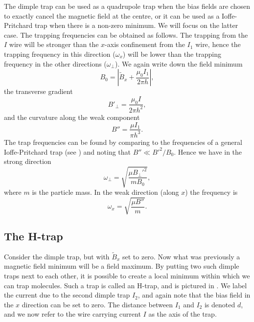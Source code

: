 The dimple trap can be used as a quadrupole trap when the bias fields are
chosen to exactly cancel the magnetic field at the centre, or it can be used as
a Ioffe-Pritchard trap when there is a non-zero minimum. We will focus on the
latter case.
%
The trapping frequencies can be obtained as follows. 
%
The trapping from the $I$ wire will be stronger than the $x$-axis
confinement from the $I_1$ wire, hence the trapping frequency in this
direction ($\omega_x$) will be lower than the trapping frequency in the other
directions ($\omega_\perp$). We again write down the field minimum
%
\begin{equation}
  B_0 = \left|\tilde{B}_x + \frac{\mu_0 I_1}{2\pi h}\right|,
\end{equation}
%
the transverse gradient
%
\begin{equation}
  B'_\perp = \frac{\mu_0 I}{2 \pi h^2},
  \label{theory:eqn:dimplegrad}
\end{equation}
%
and the curvature along the weak component
%
\begin{equation}
  B'' = \frac{\mu I_1}{\pi h^3}.
\end{equation}
%
The trap frequencies can be found by comparing to the frequencies of a general
Ioffe-Pritchard trap (see ) and noting that $B'' \ll
B'^2/B_0$. Hence we have in the strong direction
%
\begin{equation}
  \omega_\perp = \sqrt{\frac{\mu B_\perp'^2}{m B_0}},
  \label{theory:eqn:perpfreq}
\end{equation}
%
where $m$ is the particle mass. In the weak direction (along $x$) the frequency
is
%
\begin{equation}
  \omega_x = \sqrt{\frac{\mu B''}{m}}.
  \label{theory:eqn:xfreq}
\end{equation}

\subsection{The H-trap}

Consider the dimple trap, but with $\tilde{B}_x$ set to zero. Now what was
previously a magnetic field minimum will be a field maximum. By putting two
such dimple traps next to each other, it is possible to create a local minimum
within which we can trap molecules. Such a trap is called an H-trap, and is
pictured in . We label the current due to the second
dimple trap $I_2$, and again note that the bias field in the $x$ direction can
be set to zero. The distance between $I_1$ and $I_2$ is denoted $d$, and we now
refer to the wire carrying current $I$ as the axis of the trap.

